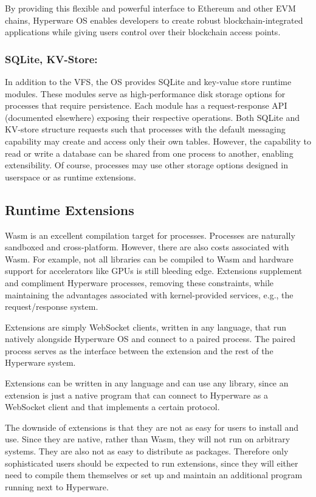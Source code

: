 \documentclass[runningheads]{llncs}
\begin{document}
By providing this flexible and powerful interface to Ethereum and other EVM chains, Hyperware OS enables developers to create robust blockchain-integrated applications while giving users control over their blockchain access points.

\subsubsection{SQLite, KV-Store:}
\label{sec:osdbs}

In addition to the VFS, the OS provides SQLite and key-value store runtime modules.
These modules serve as high-performance disk storage options for processes that require persistence.
Each module has a request-response API (documented elsewhere) exposing their respective operations.
Both SQLite and KV-store structure requests such that processes with the default messaging capability may create and access only their own tables.
However, the capability to read or write a database can be shared from one process to another, enabling extensibility.
Of course, processes may use other storage options designed in userspace or as runtime extensions.

\subsection{Runtime Extensions}
\label{sec:osextensions}

Wasm is an excellent compilation target for processes.
Processes are naturally sandboxed and cross-platform.
However, there are also costs associated with Wasm.
For example, not all libraries can be compiled to Wasm and hardware support for accelerators like GPUs is still bleeding edge.
Extensions supplement and compliment Hyperware processes, removing these constraints, while maintaining the advantages associated with kernel-provided services, e.g., the request/response system.

Extensions are simply WebSocket clients, written in any language, that run natively alongside Hyperware OS and connect to a paired process.
The paired process serves as the interface between the extension and the rest of the Hyperware system.

Extensions can be written in any language and can use any library, since an extension is just a native program that can connect to Hyperware as a WebSocket client and that implements a certain protocol.

The downside of extensions is that they are not as easy for users to install and use.
Since they are native, rather than Wasm, they will not run on arbitrary systems.
They are also not as easy to distribute as packages.
Therefore only sophisticated users should be expected to run extensions, since they will either need to compile them themselves or set up and maintain an additional program running next to Hyperware.
\end{document}
